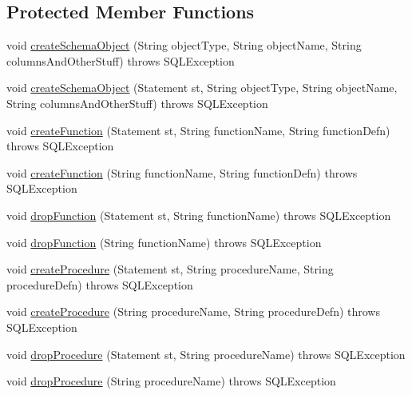 \subsection*{Protected Member Functions}
\begin{DoxyCompactItemize}
\item 
void \mbox{\hyperlink{classtestsuite_1_1_base_test_case_a43e16f16b388ad8133b17147588e6670}{create\+Schema\+Object}} (String object\+Type, String object\+Name, String columns\+And\+Other\+Stuff)  throws S\+Q\+L\+Exception 
\item 
void \mbox{\hyperlink{classtestsuite_1_1_base_test_case_a7c9a8512d5ed0cfbe4b80a8f1b990b24}{create\+Schema\+Object}} (Statement st, String object\+Type, String object\+Name, String columns\+And\+Other\+Stuff)  throws S\+Q\+L\+Exception 
\item 
void \mbox{\hyperlink{classtestsuite_1_1_base_test_case_ab964ad68ca60ae9fef1deeef48b25c79}{create\+Function}} (Statement st, String function\+Name, String function\+Defn)  throws S\+Q\+L\+Exception 
\item 
void \mbox{\hyperlink{classtestsuite_1_1_base_test_case_a308f048150ff4bde942c42021b9b2a09}{create\+Function}} (String function\+Name, String function\+Defn)  throws S\+Q\+L\+Exception 
\item 
void \mbox{\hyperlink{classtestsuite_1_1_base_test_case_ae40d8d8c945d750bd064ea265a1c48f3}{drop\+Function}} (Statement st, String function\+Name)  throws S\+Q\+L\+Exception 
\item 
void \mbox{\hyperlink{classtestsuite_1_1_base_test_case_a361ab79861482404c0eb3c637fbf92e2}{drop\+Function}} (String function\+Name)  throws S\+Q\+L\+Exception 
\item 
void \mbox{\hyperlink{classtestsuite_1_1_base_test_case_a255cff56778ce81df619a9fb50a36696}{create\+Procedure}} (Statement st, String procedure\+Name, String procedure\+Defn)  throws S\+Q\+L\+Exception 
\item 
void \mbox{\hyperlink{classtestsuite_1_1_base_test_case_a5d65f7a995144e564691da9ee898406a}{create\+Procedure}} (String procedure\+Name, String procedure\+Defn)  throws S\+Q\+L\+Exception 
\item 
void \mbox{\hyperlink{classtestsuite_1_1_base_test_case_a479da62297639342738924a0c27f88af}{drop\+Procedure}} (Statement st, String procedure\+Name)  throws S\+Q\+L\+Exception 
\item 
void \mbox{\hyperlink{classtestsuite_1_1_base_test_case_ae81b9c574af66ec9f7af48837aca37fc}{drop\+Procedure}} (String procedure\+Name)  throws S\+Q\+L\+Exception 

\end{DoxyCompactItemize}
